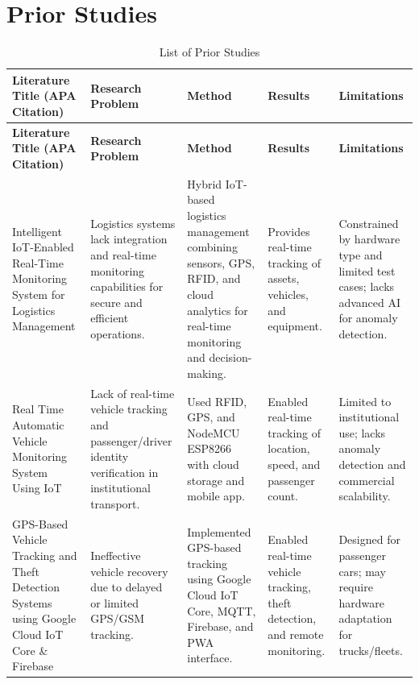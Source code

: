 \section{Prior Studies}
\begin{SingleSpace} %
\renewcommand{\arraystretch}{1} %
\scriptsize %

\begin{longtable}{|p{}|p{}|p{}|p{}|p{}|}
\caption{List of Prior Studies} \label{tab:list_of_prior_studies} \\
\hline
\textbf{Literature Title (APA Citation)} & \textbf{Research Problem} & \textbf{Method} & \textbf{Results} & \textbf{Limitations} \\
\hline
\endfirsthead

\hline
\textbf{Literature Title (APA Citation)} & \textbf{Research Problem} & \textbf{Method} & \textbf{Results} & \textbf{Limitations} \\
\hline
\endhead

Intelligent IoT-Enabled Real-Time Monitoring System for Logistics Management \cite{joshi2024intelligent} &
Logistics systems lack integration and real-time monitoring capabilities for secure and efficient operations. &
Hybrid IoT-based logistics management combining sensors, GPS, RFID, and cloud analytics for real-time monitoring and decision-making. &
Provides real-time tracking of assets, vehicles, and equipment. &
Constrained by hardware type and limited test cases; lacks advanced AI for anomaly detection. \\
\hline

Real Time Automatic Vehicle Monitoring System Using IoT \cite{g2022real} &
Lack of real-time vehicle tracking and passenger/driver identity verification in institutional transport. &
Used RFID, GPS, and NodeMCU ESP8266 with cloud storage and mobile app. &
Enabled real-time tracking of location, speed, and passenger count. &
Limited to institutional use; lacks anomaly detection and commercial scalability. \\
\hline

GPS-Based Vehicle Tracking and Theft Detection Systems using Google Cloud IoT Core \& Firebase \cite{crisgar2021gps} &
Ineffective vehicle recovery due to delayed or limited GPS/GSM tracking. &
Implemented GPS-based tracking using Google Cloud IoT Core, MQTT\glsadd{MQTT}, Firebase, and PWA\glsadd{PWA} interface. &
Enabled real-time vehicle tracking, theft detection, and remote monitoring. &
Designed for passenger cars; may require hardware adaptation for trucks/fleets. \\
\hline


\end{longtable}
\end{SingleSpace}
